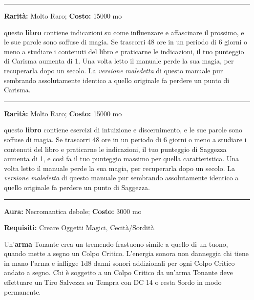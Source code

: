 \begin{multicols}{2}
\smallskip\noindent\rule{\linewidth}{2pt}  \hypertarget{Tomodell'Autoritàedell'Influenza}{}\smallskip{}\noindent\label{Tomodell'Autoritàedell'Influenza}

\textbf{Rarità:} Molto Raro; \textbf{Costo:} 15000 mo

questo \textbf{libro} contiene indicazioni su come influenzare e affascinare il prossimo, e le sue parole sono soffuse di magia. Se trascorri 48 ore in un periodo di 6 giorni o meno a studiare i contenuti del libro e praticarne le indicazioni, il tuo punteggio di Carisma aumenta di 1. Una volta letto il manuale perde la sua magia, per recuperarla dopo un secolo. La \emph{versione maledetta} di questo manuale pur sembrando assolutamente identico a quello originale fa perdere un punto di Carisma.

\smallskip\noindent\rule{\linewidth}{2pt}  \hypertarget{TomodellaComprensione}{}\smallskip{}\noindent\label{TomodellaComprensione}

\textbf{Rarità:} Molto Raro; \textbf{Costo:} 15000 mo

questo \textbf{libro} contiene esercizi di intuizione e discernimento, e le sue parole sono soffuse di magia. Se trascorri 48 ore in un periodo di 6 giorni o meno a studiare i contenuti del libro e praticarne le indicazioni, il tuo punteggio di Saggezza aumenta di 1, e così fa il tuo punteggio massimo per quella caratteristica. Una volta letto il manuale perde la sua magia, per recuperarla dopo un secolo. La \emph{versione maledetta} di questo manuale pur sembrando assolutamente identico a quello originale fa perdere un punto di Saggezza.

\smallskip\noindent\rule{\linewidth}{2pt}  \hypertarget{Tonante}{}\smallskip{}\noindent\label{Tonante}

\textbf{Aura:} Necromantica debole; \textbf{Costo:} 3000 mo

\textbf{Requisiti:} Creare Oggetti Magici, Cecità/Sordità

Un'\textbf{arma} Tonante crea un tremendo frastuono simile a quello di un tuono, quando mette a segno un Colpo Critico. L'energia sonora non danneggia chi tiene in mano l'arma e infligge 1d8 danni sonori addizionali per ogni Colpo Critico andato a segno. Chi è soggetto a un Colpo Critico da un'arma Tonante deve effettuare un Tiro Salvezza su Tempra con DC 14 o resta Sordo in modo permanente.


\end{multicols}
